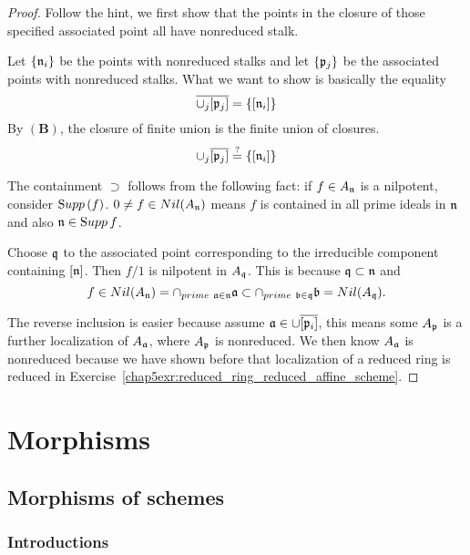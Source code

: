 \documentclass[11pt]{book} %
\begin{document}
\begin{proof}
Follow the hint, we first show that the points in the closure of those specified associated point all have nonreduced stalk.

Let $\{{\mathfrak n}_i\}$ be the points with nonreduced stalks and let $\{{\mathfrak p}_j\}$ be the associated points with nonreduced stalks. What we want to show is basically the equality
$$
\overline{\cup_j [{\mathfrak p}_j]}=\{[{\mathfrak n}_i]\}
$$
By $\mathbf{(B)}$, the closure of finite union is the finite union of closures.
$$
\cup_j \overline{[{\mathfrak p}_j]}\overset{?}{=}\{[{\mathfrak n}_i]\}
$$

The containment $\supset$ follows from the following fact: if $f\in A_{\mathfrak n}$ is a nilpotent, consider ${\text Supp\thinspace}(f)$.
$0\neq f\in Nil(A_{\mathfrak n})$ means $f$ is contained in all prime ideals in ${\mathfrak n}$ and also ${\mathfrak n}\in {\text Supp\thinspace} f$.

Choose $\mathfrak q$ to the associated point corresponding to the irreducible component containing $[{\mathfrak n}]$. Then $f/1$ is nilpotent in $A_\mathfrak q$. This is because $\mathfrak q\subset {\mathfrak n}$ and $$f\in Nil(A_{\mathfrak n})=\cap_{prime\ {\mathfrak a}\in {\mathfrak n}}{\mathfrak a}\subset \cap_{prime\ {\mathfrak b}\in \mathfrak q}{\mathfrak b}=Nil(A_\mathfrak q).$$

The reverse inclusion is easier because assume
${\mathfrak a}\in \cup\overline{[{\mathfrak p}_i]}$, this means some $A_{\mathfrak p}$ is a further localization of $A_{\mathfrak a}$, where $A_{\mathfrak p}$ is nonreduced. We then know $A_{\mathfrak a}$ is nonreduced because we have shown before that localization of a reduced ring is reduced in Exercise~\ref{chap5exr:reduced_ring_reduced_affine_scheme}.
\end{proof}


\part{Morphisms}
\chapter{Morphisms of schemes}
\section{Introductions}
\end{document}
